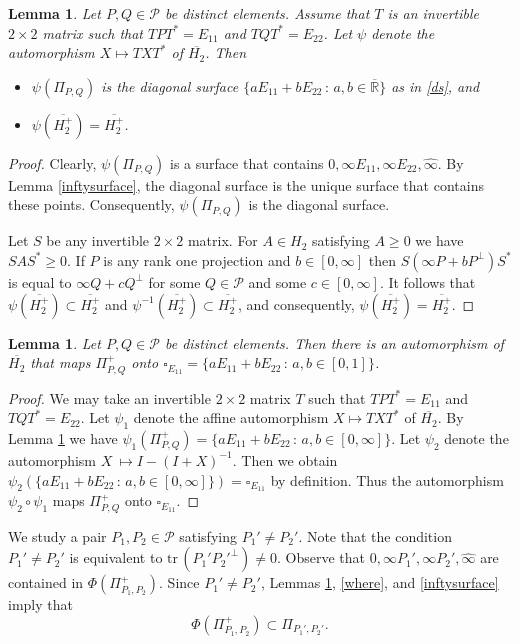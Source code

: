 \documentclass[10pt]{amsart}
\newtheorem{lemma}[theorem]{Lemma}
\theoremstyle{definition}
\theoremstyle{remark}
\numberwithin{subsection}{section}
\numberwithin{equation}{section}
\newcommand\cP{{\mathcal{P}}}
\newcommand\oH{{\overline{H_2}}}
\newcommand\oHp{{\overline{H_2^+}}}
\newcommand\oi{{\widehat{\infty}}}
\newcommand\oR{{\overline{\mathbb{R}}}}
\newcommand\pp{{\Pi_{P,Q}^+}}
\newcommand\ppp{{\Pi_{P_1,P_2}^+}}
\begin{document}
\begin{lemma}\label{nasunek}
Let $P, Q\in \cP$ be distinct elements. 
Assume that $T$ is an invertible $2\times 2$ matrix such that $TPT^*=E_{11}$ and $TQT^*=E_{22}$. Let $\psi$ denote the automorphism $X\mapsto TXT^*$ of $\oH$. Then
\begin{itemize}
\item $\psi(\Pi_{P,Q})$ is the diagonal surface $\{ a E_{11} + b E_{22} \, : \, a,b \in {\oR} \}$ as in \eqref{ds}, and
\item $\psi(\oHp) = \oHp$.
\end{itemize}
\end{lemma}

\begin{proof}
Clearly, $\psi(\Pi_{P,Q})$ is a surface that contains $0, \infty E_{11}, \infty E_{22}, \oi$. By Lemma \ref{inftysurface}, the diagonal surface is the unique surface that contains these points. Consequently,  $\psi(\Pi_{P,Q})$ is the diagonal surface. 

Let $S$ be any invertible $2\times 2$ matrix. For $A \in H_2$ satisfying $A \ge 0$ we have $SAS^\ast \ge 0$. If $P$ is any rank one projection and $b \in [0, \infty]$ then $S(\infty P +bP^\perp )S^\ast$ is equal to $\infty Q + c Q^\perp$ for some $Q \in \mathcal{P}$ and some $c \in [0, \infty]$. It follows that 
$\psi(\oHp) \subset \oHp$ and $\psi^{-1}(\oHp) \subset \oHp$, and consequently, $\psi(\oHp) = \oHp$.
\end{proof}

\begin{lemma}\label{inftysquare}
Let $P, Q\in \cP$ be distinct elements. 
Then there is an automorphism of $\oH$ that maps $\pp$ onto ${\square}_{E_{11}}=\{ a E_{11} + b E_{22} \, : \, a,b \in [0,1] \}$.
\end{lemma}
\begin{proof}
We may take an invertible $2\times 2$ matrix $T$ such that $TPT^*=E_{11}$ and $TQT^*=E_{22}$. 
Let $\psi_1$ denote the affine automorphism $X\mapsto TXT^*$ of $\oH$. 
By Lemma \ref{nasunek} we have $\psi_1(\pp)=\{aE_{11}+bE_{22}\,:\, a, b\in [0, \infty]\}$. 
Let $\psi_2$ denote the automorphism $X\ \mapsto I - (I+X)^{-1}$. 
Then we obtain $\psi_2(\{aE_{11}+bE_{22}\,:\, a, b\in [0, \infty]\}) ={\square}_{E_{11}}$ by definition.
Thus the automorphism $\psi_2\circ \psi_1$ maps $\pp$ onto ${\square}_{E_{11}}$. 
\end{proof}


We study a pair $P_1, P_2\in \cP$ satisfying $P_1'\neq P_2'$. Note that the condition  $P_1'\neq P_2'$ is equivalent to $ \mathrm{tr}\,(P_1'{P_2'}^\perp) \not= 0$. 
Observe that $0, \infty P_1', \infty P_2', \oi$ are contained in $\Phi(\ppp)$.
Since $P_1'\neq P_2'$, Lemmas \ref{inftysquare}, \ref{where}, and \ref{inftysurface} imply that 
\begin{equation}\label{phippp}
\Phi(\ppp)\subset\Pi_{P_1',P_2'}.
\end{equation} 
\end{document}
